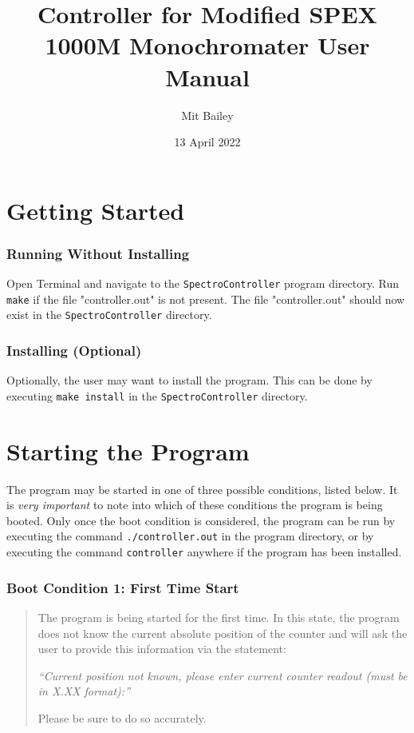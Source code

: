 \documentclass{article}
\title{Controller for Modified SPEX 1000M Monochromater User Manual}
\author{Mit Bailey}
\date{13 April 2022}
\begin{document}
\maketitle
\newpage

\tableofcontents
\newpage

\section{Getting Started} \label{section:gettingstarted}

\subsubsection{Running Without Installing}
Open Terminal and navigate to the \verb|SpectroController| program directory. Run \verb|make| if the file "controller.out" is not present. The file "controller.out" should now exist in the \verb|SpectroController| directory.

\subsubsection{Installing (Optional)}
Optionally, the user may want to install the program. This can be done by executing \verb|make install| in the \verb|SpectroController| directory.


\section{Starting the Program} \label{section:startingtheprogram}

The program may be started in one of three possible conditions, listed below. It is \emph{very important} to note into which of these conditions the program is being booted. Only once the boot condition is considered, the program can be run by executing the command \verb|./controller.out| in the program directory, or by executing the command \verb|controller| anywhere if the program has been installed.

\subsubsection{Boot Condition 1: First Time Start} \label{subsubsection:bootcon1}
\begin{quote}
    The program is being started for the first time. In this state, the program does not know the current absolute position of the counter and will ask the user to provide this information via the statement:
    
    \emph{“Current position not known, please enter current counter readout (must be in X.XX format):”}
    
    Please be sure to do so accurately.
\end{quote}
\end{document}
